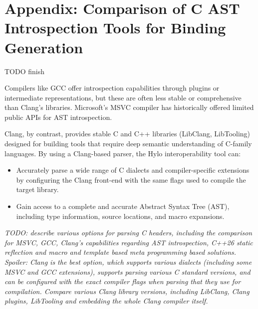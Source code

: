 \section{Appendix: Comparison of C AST Introspection Tools for Binding Generation}
\label{app:c_ast_introspection_tools}
TODO finish

Compilers like GCC offer introspection capabilities through plugins or intermediate representations, but these are often less stable or comprehensive than Clang's libraries. Microsoft's MSVC compiler has historically offered limited public APIs for AST introspection.

Clang, by contrast, provides stable C and C++ libraries (LibClang, LibTooling) designed for building tools that require deep semantic understanding of C-family languages. By using a Clang-based parser, the Hylo interoperability tool can:

\begin{itemize}
    \item Accurately parse a wide range of C dialects and compiler-specific extensions by configuring the Clang front-end with the same flags used to compile the target library.
    \item Gain access to a complete and accurate Abstract Syntax Tree (AST), including type information, source locations, and macro expansions.
\end{itemize}

\textit{TODO: describe various options for parsing C headers, including the comparison for MSVC, GCC, Clang's capabilities regarding AST introspection, C++26 static reflection and macro and template based meta programming based solutions. Spoiler: Clang is the best option, which supports various dialects (including some MSVC and GCC extensions), supports parsing various C standard versions, and can be configured with the exact compiler flags when parsing that they use for compilation. Compare various Clang library versions, including LibClang, Clang plugins, LibTooling and embedding the whole Clang compiler itself.
}
